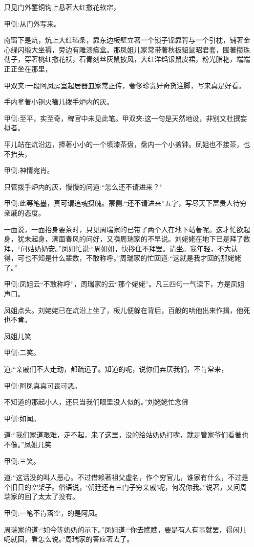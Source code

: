 \begin{parag}
    只见门外錾铜钩上悬著大红撒花软帘，\begin{note}甲侧:从门外写来。\end{note}南窗下是炕，炕上大红毡条，靠东边板壁立著一个锁子锦靠背与一个引枕，铺著金心绿闪缎大坐褥，旁边有雕漆痰盒。那凤姐儿家常带著秋板貂鼠昭君套，围著攒珠勒子，穿著桃红撒花袄，石青刻丝灰鼠披风，大红洋绉银鼠皮裙，粉光脂艳，端端正正坐在那里，\begin{note}甲双夹:一段阿凤房室起居器皿家常正传，奢侈珍贵好奇货注脚，写来真是好看。\end{note}手内拿著小铜火箸儿拨手炉内的灰。\begin{note}甲侧:至平，实至奇，稗官中未见此笔。甲双夹:这一句是天然地设，非别文杜撰妄拟者。\end{note}平儿站在炕沿边，捧著小小的一个填漆茶盘，盘内一个小盖钟。凤姐也不接茶，也不抬头，\begin{note}甲侧:神情宛肖。\end{note}只管拨手炉内的灰，慢慢的问道:“怎么还不请进来？”\begin{note}甲侧:此等笔墨，真可谓追魂摄魄。蒙侧:“还不请进来”五字，写尽天下富贵人待穷亲戚的态度。\end{note}一面说，一面抬身要茶时，只见周瑞家的已带了两个人在地下站著呢。这才忙欲起身，犹未起身，满面春风的问好，又嗔周瑞家的不早说。刘姥姥在地下已是拜了数拜，“问姑奶奶安。”凤姐忙说:“周姐姐，快搀住不拜罢。请坐。我年轻，不大认得，可也不知是什么辈数，不敢称呼。”周瑞家的忙回道:“这就是我才回的那姥姥了。”\begin{note}甲侧:凤姐云“不敢称呼”，周瑞家的云“那个姥姥”。凡三四句一气读下，方是凤姐声口。\end{note}凤姐点头。刘姥姥已在炕沿上坐了，板儿便躲在背后，百般的哄他出来作揖，他死也不肯。
\end{parag}


\begin{parag}
    凤姐儿笑\begin{note}甲侧:二笑。\end{note}道:“亲戚们不大走动，都疏远了。知道的呢，说你们弃厌我们，不肯常来，\begin{note}甲侧:阿凤真真可畏可恶。\end{note}不知道的那起小人，还只当我们眼里没人似的。”刘姥姥忙念佛\begin{note}甲侧:如闻。\end{note}道:“我们家道艰难，走不起，来了这里，没的给姑奶奶打嘴，就是管家爷们看著也不像。”凤姐儿笑\begin{note}甲侧:三笑。\end{note}道:“这话没的叫人恶心。不过借赖著祖父虚名，作个穷官儿，谁家有什么，不过是个旧日的空架子。俗语说，‘朝廷还有三门子穷亲戚’呢，何况你我。”说著，又问周瑞家的回了太太了没有。\begin{note}甲侧:一笔不肯落空，的是阿凤。\end{note}周瑞家的道:“如今等奶奶的示下。”凤姐道:“你去瞧瞧，要是有人有事就罢，得闲儿呢就回，看怎么说。”周瑞家的答应著去了。
\end{parag}


